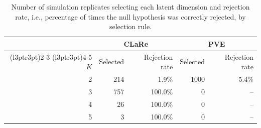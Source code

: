 \begin{table}[htbp]
\centering
\caption{Number of simulation replicates selecting each latent dimension and rejection rate, i.e., percentage of times the null hypothesis was correctly rejected, by selection rule.}
\label{tab:quantile-selection-rejection}

\begin{tabular}{rrrrr}
\toprule
\multicolumn{1}{c}{ } & \multicolumn{2}{c}{CLaRe} & \multicolumn{2}{c}{PVE} \\
\cmidrule(l{3pt}r{3pt}){2-3} \cmidrule(l{3pt}r{3pt}){4-5}
$K$ & Selected & Rejection rate & Selected & Rejection rate\\
\midrule
2 & 214 & 1.9\% & 1000 & 5.4\%\\
3 & 757 & 100.0\% & 0 & --\\
4 & 26 & 100.0\% & 0 & --\\
5 & 3 & 100.0\% & 0 & --\\
\bottomrule
\end{tabular}
\end{table}
